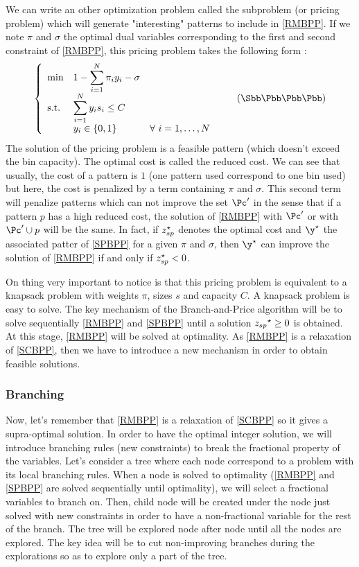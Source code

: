 We can write an other optimization problem called the subproblem (or pricing problem) which will generate "interesting" patterns to include in \eqref{RMBPP}. If we note $\pi$ and $\sigma$ the optimal dual variables corresponding to the first and second constraint of \eqref{RMBPP}, this pricing problem takes the following form :
\begin{equation}
	\label{SPBPP}
		\left \{
		\begin{array}{*5{>{\displaystyle}l}}
		\min & 1-\sum_{i=1}^{N} \pi_i y_i - \sigma \\
		\st & \sum_{i=1}^{N} y_i s_i \leq C \\
		& y_i \in \{0,1\} &  \forall \ i = 1,\dots,N
		\end{array}
		\right.
	\tag{$\Sbb\Pbb\Bbb\Pbb\Pbb$}
\end{equation}
The solution of the pricing problem is a feasible pattern (\ie which doesn't exceed the bin capacity). The optimal cost is called the reduced cost. We can see that usually, the cost of a pattern is $1$ (one pattern used correspond to one bin used) but here, the cost is penalized by a term containing $\pi$ and $\sigma$. This second term will penalize patterns which can not improve the set $\Pc'$ in the sense that if a pattern $p$ has a high reduced cost, the solution of \eqref{RMBPP} with $\Pc'$ or with $\Pc' \cup p$ will be the same. In fact, if ${z}^{\star}_{sp}$ denotes the optimal cost and $\opt{\y}$ the associated patter of \eqref{SPBPP} for a given $\pi$ and $\sigma$, then $\opt{\y}$ can improve the solution of \eqref{RMBPP}
if and only if ${z}^{\star}_{sp}<0$.

On thing very important to notice is that this pricing problem is equivalent to a knapsack problem with weights $\pi$, sizes $s$ and capacity $C$. A knapsack problem is easy to solve. The key mechanism of the Branch-and-Price algorithm will be to solve sequentially \eqref{RMBPP} and \eqref{SPBPP} until a solution ${z_{sp}}^{\star} \geq 0$ is obtained. At this stage, \eqref{RMBPP} will be solved at optimality. As \eqref{RMBPP} is a relaxation of \eqref{SCBPP}, then we have to introduce a new mechanism in order to obtain feasible solutions.

\subsubsection{Branching}

Now, let's remember that \eqref{RMBPP} is a relaxation of \eqref{SCBPP} so it gives a supra-optimal solution. In order to have the optimal integer solution, we will introduce branching rules (new constraints) to break the fractional property of the variables. Let's consider a tree where each node correspond to a problem with its local branching rules. When a node is solved to optimality (\ie \eqref{RMBPP} and \eqref{SPBPP} are solved sequentially until optimality), we will select a fractional variables to branch on. Then, child node will be created under the node just solved with new constraints in order to have a non-fractional variable for the rest of the branch. The tree will be explored node after node until all the nodes are explored. The key idea will be to cut non-improving branches during the explorations so as to explore only a part of the tree.

